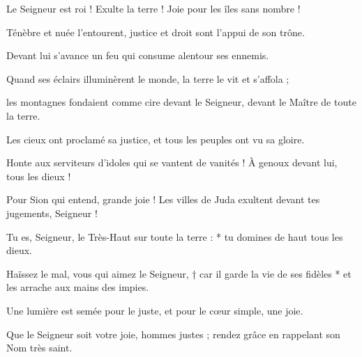 \item Le Seigneur est roi ! Exulte la terre ! Joie pour les îles sans nombre !
\item Ténèbre et nuée l'entourent, justice et droit sont l'appui de son trône.
\item Devant lui s'avance un feu qui consume alentour ses ennemis.
\item Quand ses éclairs illuminèrent le monde, la terre le vit et s'affola ;
\item les montagnes fondaient comme cire devant le Seigneur, devant le Maître de toute la terre.
\item Les cieux ont proclamé sa justice, et tous les peuples ont vu sa gloire.
\item Honte aux serviteurs d'idoles qui se vantent de vanités ! À genoux devant lui, tous les dieux !
\item Pour Sion qui entend, grande joie ! Les villes de Juda exultent devant tes jugements, Seigneur !
\item Tu es, Seigneur, le Très-Haut sur toute la terre : * tu domines de haut tous les dieux.
\item Haïssez le mal, vous qui aimez le Seigneur, † car il garde la vie de ses fidèles * et les arrache aux mains des impies.
\item Une lumière est semée pour le juste, et pour le cœur simple, une joie.
\item Que le Seigneur soit votre joie, hommes justes ; rendez grâce en rappelant son Nom très saint.
